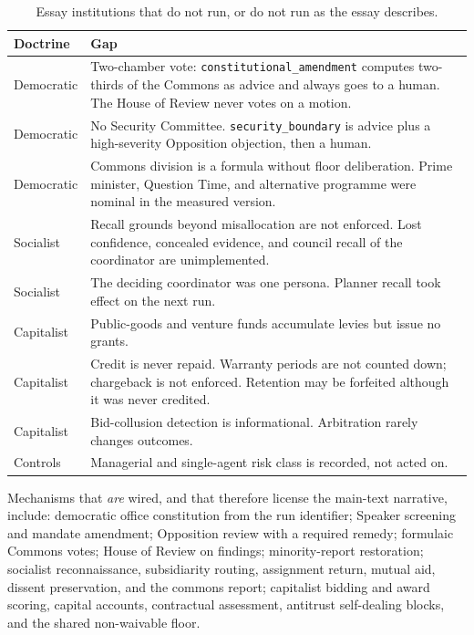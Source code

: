 \documentclass[11pt,a4paper]{article}
\begin{document}
\begin{table}[h]
\centering
\caption{Essay institutions that do not run, or do not run as the essay describes.}
\label{tab:gaps}
\begin{tabular}{@{}lp{10.2cm}@{}}
\toprule
Doctrine & Gap \\
\midrule
Democratic &
Two-chamber vote: \texttt{constitutional\_amendment} computes two-thirds of the Commons
as advice and always goes to a human. The House of Review never votes on a motion. \\
Democratic &
No Security Committee. \texttt{security\_boundary} is advice plus a high-severity
Opposition objection, then a human. \\
Democratic &
Commons division is a formula without floor deliberation. Prime minister, Question Time,
and alternative programme were nominal in the measured version. \\
Socialist &
Recall grounds beyond misallocation are not enforced. Lost confidence, concealed
evidence, and council recall of the coordinator are unimplemented. \\
Socialist &
The deciding coordinator was one persona. Planner recall took effect on the next run. \\
Capitalist &
Public-goods and venture funds accumulate levies but issue no grants. \\
Capitalist &
Credit is never repaid. Warranty periods are not counted down; chargeback is not
enforced. Retention may be forfeited although it was never credited. \\
Capitalist &
Bid-collusion detection is informational. Arbitration rarely changes outcomes. \\
Controls &
Managerial and single-agent risk class is recorded, not acted on. \\
\bottomrule
\end{tabular}
\end{table}

Mechanisms that \emph{are} wired, and that therefore license the main-text narrative,
include: democratic office constitution from the run identifier; Speaker screening and
mandate amendment; Opposition review with a required remedy; formulaic Commons votes;
House of Review on findings; minority-report restoration; socialist reconnaissance,
subsidiarity routing, assignment return, mutual aid, dissent preservation, and the
commons report; capitalist bidding and award scoring, capital accounts, contractual
assessment, antitrust self-dealing blocks, and the shared non-waivable floor.
\end{document}

